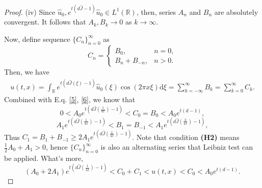 \documentclass[12pt]{article}
\newcommand{\R}{\mathbb{R}}
\newcommand{\dd}{\mathrm{d}}
\begin{document}
\begin{proof}
(iv) Since \(\hat{u}_0, e^{t(d\hat{J}-1)} \hat{u}_0\in L^1(\R)\), then, series \(A_n\) and \(B_n\) are absolutely convergent. It follows that \(A_k, B_k\rightarrow0\) as \(k\rightarrow \infty\).


Now, define sequence \(\{C_n\}_{n=0}^\infty\) as
\[C_n = 
\begin{cases} 
	B_0, & n = 0, \\ 
	B_n+B_{-n}, & n > 0. 
\end{cases}\]
Then, we have
\begin{align*}
u(t,x) = \int_{\mathbb{R}} e^{t(d\hat{J}(\xi)-1)}\hat{u}_0(\xi)\cos(2\pi x \xi)\dd \xi
= \sum_{k=-\infty}^{\infty} B_k=\sum_{k=0}^{\infty} C_k.
\end{align*}
 Combined with E.q. \eqref{5}, \eqref{6}, we know that 
 \[0<A_0e^{t\left( d\hat{J}\left( \frac{1}{4x} \right)-1 \right)} < C_0=B_0 < A_0e^{t(d-1)},\]
 	\[A_1 e^{t\left( d\hat{J}\left( \frac{1}{4x} \right)-1 \right)} < B_1=B_{-1} < A_1 e^{t\left( d\hat{J}\left( \frac{3}{4x} \right)-1 \right)}, \]
 Thus \(C_1=B_1+B_{-1}\geq2A_1 e^{t\left( d\hat{J}\left( \frac{1}{4x} \right)-1 \right)}\). Note that condition \textbf{(H2)} means \(\frac{1}{2}A_0+A_1>0\), hence \(\{C_n\}_{n=0}^{\infty}\) is also an alternating series that Leibniz test can be applied. What's more,
  \begin{equation}\label{7}
  	(A_0 + 2A_1)e^{t(d\hat{J}(\frac{1}{4x})-1)} <C_0+C_1< u(t,x) <C_0< A_0e^{t(d-1)}.
  \end{equation}
  

\end{proof}
\end{document}
